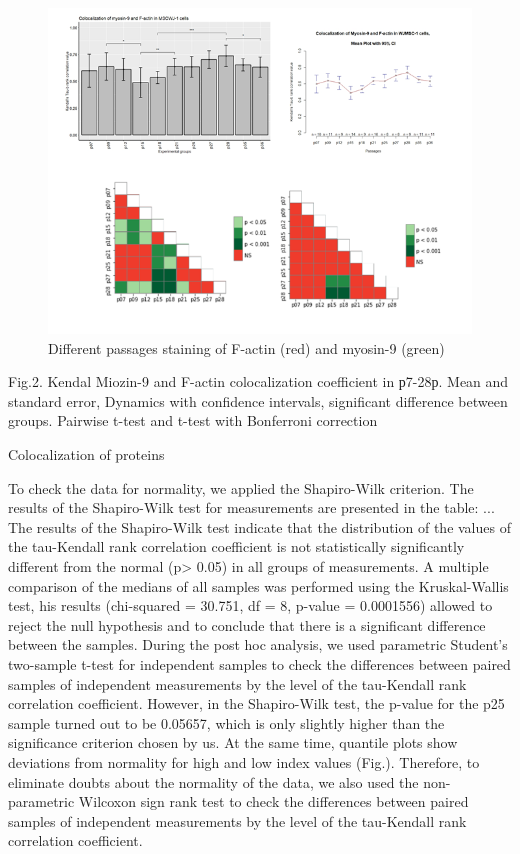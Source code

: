 \documentclass[a4paper,12pt]{article}
\begin{document}
\begin{figure}[hbt!]
\centering
\includegraphics[width=0.8\linewidth]{fig2.png}
\caption{Different passages staining of F-actin (red) and myosin-9 (green)}
\label{fig:fig2}
\end{figure}

Fig.2. Kendal Miozin-9 and F-actin colocalization coefficient in р7-28р. Mean and standard error, Dynamics with confidence intervals, significant difference between groups. Pairwise t-test and t-test with Bonferroni correction

Colocalization of proteins

To check the data for normality, we applied the Shapiro-Wilk criterion.
The results of the Shapiro-Wilk test for measurements are presented in the table:
...
The results of the Shapiro-Wilk test indicate that the distribution of the values of the tau-Kendall rank correlation coefficient is not statistically significantly different from the normal (p> 0.05) in all groups of measurements. A multiple comparison of the medians of all samples was performed using the Kruskal-Wallis test, his results (chi-squared = 30.751, df = 8, p-value = 0.0001556) allowed to reject the null hypothesis and to conclude that there is a significant difference between the samples.
 During the post hoc analysis, we used parametric Student’s two-sample t-test for independent samples to check the differences between paired samples of independent measurements by the level of the tau-Kendall rank correlation coefficient.
However, in the Shapiro-Wilk test, the p-value for the p25 sample turned out to be 0.05657, which is only slightly higher than the significance criterion chosen by us. At the same time, quantile plots show deviations from normality for high and low index values (Fig.).
Therefore, to eliminate doubts about the normality of the data, we also used the non-parametric Wilcoxon sign rank test to check the differences between paired samples of independent measurements by the level of the tau-Kendall rank correlation coefficient.
\end{document}
